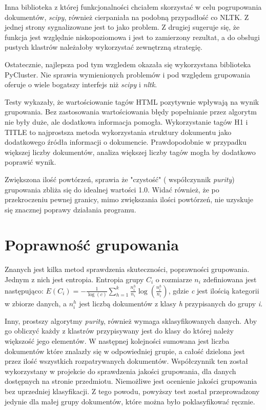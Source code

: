 \documentclass{article}
\begin{document}
Inna biblioteka z której funkcjonalności chciałem skorzystać w celu pogrupowania dokumentów, \emph{scipy}, również cierpaniała na podobną przypadłość co NLTK. Z jednej strony sygnalizowane jest to jako problem. Z drugiej sugeruje się, że funkcja jest względnie niskopoziomowa i jest to zamierzony rezultat, a do obsługi pustych klastrów należałoby wykorzystać zewnętrzną strategię. 

Ostatecznie, najlepsza pod tym wzgledem okazała się wykorzystana biblioteka PyCluster. Nie sprawia wymienionych problemów i pod względem grupowania oferuje o wiele bogatszy interfejs niż \emph{scipy} i \emph{nltk}.

Testy wykazały, że wartościowanie tagów HTML pozytywnie wpływają na wynik grupowania. Bez zastosowania wartościowania błędy popełnianie przez algorytm nie były duże, ale dodatkowa informacja pomogła. Wykorzystanie tagów H1 i TITLE to najprostsza metoda wykorzystania struktury dokumentu jako dodatkowego źródła informacji o dokumencie. Prawdopodobnie w przypadku większej liczby dokumentów, analiza większej liczby tagów mogła by dodatkowo poprawić wynik.

Zwiększona ilość powtórzeń, sprawia że "czystość" ( współczynnik \emph{purity}) grupowania zbliża się do idealnej wartości 1.0. Widać również, że po przekroczeniu pewnej granicy, mimo zwiększania ilości powtórzeń, nie uzyskuje się znacznej poprawy działania programu.

\section{Poprawność grupowania}
Znanych jest kilka metod sprawdzenia skuteczności, poprawności grupowania. Jednym z nich jest entropia. Entropia grupy \( C_{i} \) o rozmiarze \( n_{i} \) zdefiniowana jest następująco:
\( E(C_{i}) = -\frac{1}{\log(c)}\sum_{h=1}^{k}\frac{n_i^h}{n_i}\log(\frac{n_i^h}{n_i}) \), gdzie \emph{c} jest ilością kategorii w zbiorze danych, a \( n_i^h  \) jest liczbą dokumentów z klasy \emph{h} przypisanych do grupy \emph{i}. 

Inny, prostszy algorytmy \emph{purity}, również wymaga sklasyfikowanych danych. Aby go obliczyć każdy z klastrów przypisywany jest do klasy do której należy większość jego elementów. W następnej kolejności sumowana jest liczba dokumentów które znalazły się w odpowiedniej grupie, a całość dzielona jest przez ilość wszystkich rozpatrywanych dokumentów. Współczynnik ten został wykorzystany w projekcie do sprawdzenia jakości grupowania, dla danych dostępnych na stronie przedmiotu. Niemożliwe jest ocenienie jakości grupowania bez uprzedniej klasyfikacji. Z tego powodu, powyższy test został przeprowadzony jedynie dla małej grupy dokumentów, które można było poklasyfikować ręcznie.
\end{document}
